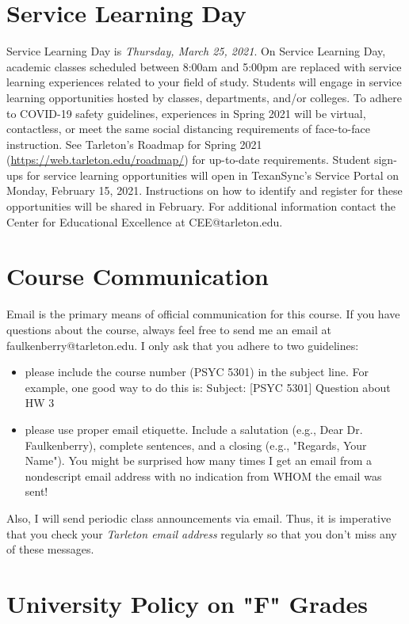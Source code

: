 \documentclass[10pt]{article}
\begin{document}
\section*{Service Learning Day}
\label{sec:orgabe65a7}
Service Learning Day is \emph{Thursday, March 25, 2021}.  On Service Learning Day, academic classes scheduled between 8:00am and 5:00pm are replaced with service learning experiences related to your field of study. Students will engage in service learning opportunities hosted by classes, departments, and/or colleges. To adhere to COVID-19 safety guidelines, experiences in Spring 2021 will be virtual, contactless, or meet the same social distancing requirements of face-to-face instruction. See Tarleton's Roadmap for Spring 2021 (\url{https://web.tarleton.edu/roadmap/}) for up-to-date requirements. Student sign-ups for service learning opportunities will open in TexanSync’s Service Portal on Monday, February 15, 2021. Instructions on how to identify and register for these opportunities will be shared in February. For additional information contact the Center for Educational Excellence at CEE@tarleton.edu.
\section*{Course Communication}
\label{sec:org0165580}

Email is the primary means of official communication for this course.  If you have questions about the course, always feel free to send me an email at faulkenberry@tarleton.edu.  I only ask that you adhere to two guidelines:
\begin{itemize}
\item please include the course number (PSYC 5301) in the subject line.  For example, one good way to do this is:  Subject: [PSYC 5301] Question about HW 3
\item please use proper email etiquette.  Include a salutation (e.g., Dear Dr. Faulkenberry), complete sentences, and a closing (e.g., "Regards, Your Name").  You might be surprised how many times I get an email from a nondescript email address with no indication from WHOM the email was sent!
\end{itemize}

Also, I will send periodic class announcements via email.  Thus, it is imperative that you check your \emph{Tarleton email address} regularly so that you don't miss any of these messages.

\section*{University Policy on "F" Grades}
\label{sec:orga053503}
\end{document}

